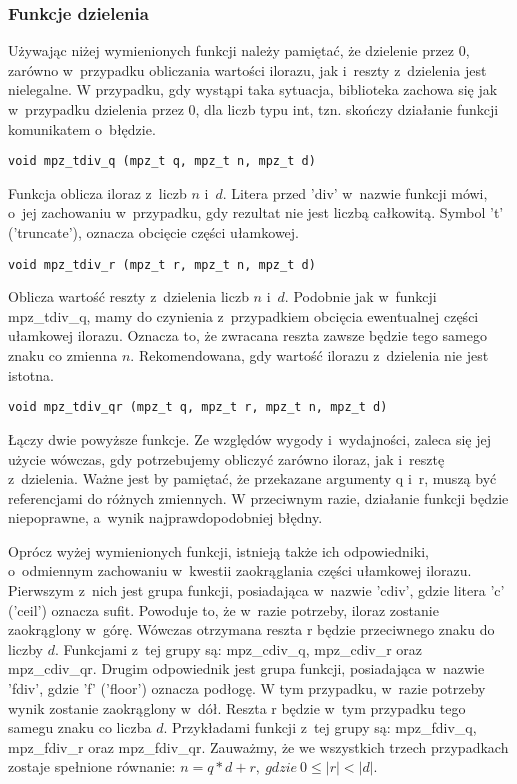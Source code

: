 \subsubsection{Funkcje dzielenia}
Używając niżej wymienionych funkcji należy pamiętać, że dzielenie przez $0$, zarówno w~przypadku obliczania wartości ilorazu, jak i~reszty z~dzielenia jest nielegalne. W przypadku, gdy wystąpi taka sytuacja, biblioteka zachowa się jak w~przypadku dzielenia przez $0$, dla liczb typu int, tzn. skończy działanie funkcji komunikatem o~błędzie.

\begin{lstlisting}
void mpz_tdiv_q (mpz_t q, mpz_t n, mpz_t d)
\end{lstlisting}

Funkcja oblicza iloraz z~liczb $n$ i~$d$. Litera przed 'div' w~nazwie funkcji mówi, o~jej zachowaniu w~przypadku, gdy rezultat nie jest liczbą całkowitą. Symbol 't' ('truncate'), oznacza obcięcie części ułamkowej.

\begin{lstlisting}
void mpz_tdiv_r (mpz_t r, mpz_t n, mpz_t d)
\end{lstlisting}

Oblicza wartość reszty z~dzielenia liczb $n$ i~$d$. Podobnie jak w~funkcji mpz\_tdiv\_q, mamy do czynienia z~przypadkiem obcięcia ewentualnej części ułamkowej ilorazu. Oznacza to, że zwracana reszta zawsze będzie tego samego znaku co zmienna $n$. Rekomendowana, gdy wartość ilorazu z~dzielenia nie jest istotna.

\begin{lstlisting}
void mpz_tdiv_qr (mpz_t q, mpz_t r, mpz_t n, mpz_t d)
\end{lstlisting}

Łączy dwie powyższe funkcje. Ze względów wygody i~wydajności, zaleca się jej użycie wówczas, gdy potrzebujemy obliczyć zarówno iloraz, jak i~resztę z~dzielenia. Ważne jest by pamiętać, że przekazane argumenty q i~r, muszą być referencjami do różnych zmiennych. W przeciwnym razie, działanie funkcji będzie niepoprawne, a~wynik najprawdopodobniej błędny.

Oprócz wyżej wymienionych funkcji, istnieją także ich odpowiedniki, o~odmiennym zachowaniu w~kwestii zaokrąglania części ułamkowej ilorazu. Pierwszym z~nich jest grupa funkcji, posiadająca w~nazwie 'cdiv', gdzie litera 'c' ('ceil') oznacza sufit. Powoduje to, że w~razie potrzeby, iloraz zostanie zaokrąglony w~górę. Wówczas otrzymana reszta r będzie przeciwnego znaku do liczby $d$. Funkcjami z~tej grupy są: mpz\_cdiv\_q, mpz\_cdiv\_r oraz mpz\_cdiv\_qr. Drugim odpowiednik jest grupa funkcji, posiadająca w~nazwie 'fdiv', gdzie 'f' ('floor') oznacza podłogę. W tym przypadku, w~razie potrzeby wynik zostanie zaokrąglony w~dół. Reszta r będzie w~tym przypadku tego samegu znaku co liczba $d$. Przykładami funkcji z~tej grupy są: mpz\_fdiv\_q, mpz\_fdiv\_r oraz mpz\_fdiv\_qr. Zauważmy, że we wszystkich trzech przypadkach zostaje spełnione równanie: $n = q*d+r,\ gdzie\ 0 \le |r| < |d|.$

